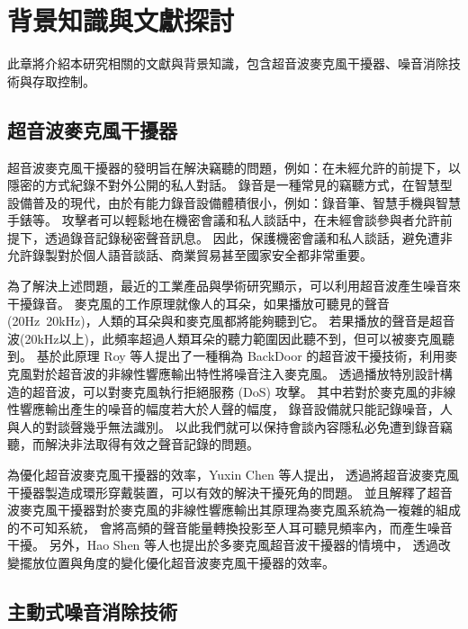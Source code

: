 \chapter{背景知識與文獻探討}

    此章將介紹本研究相關的文獻與背景知識，包含超音波麥克風干擾器、噪音消除技術與存取控制。

\section{超音波麥克風干擾器}

    超音波麥克風干擾器的發明旨在解決竊聽的問題，例如：在未經允許的前提下，以隱密的方式紀錄不對外公開的私人對話。
錄音是一種常見的竊聽方式，在智慧型設備普及的現代，由於有能力錄音設備體積很小，例如：錄音筆、智慧手機與智慧手錶等。
攻擊者可以輕鬆地在機密會議和私人談話中，在未經會談參與者允許前提下，透過錄音記錄秘密聲音訊息。
因此，保護機密會議和私人談話，避免遭非允許錄製對於個人語音談話、商業貿易甚至國家安全都非常重要。

    為了解決上述問題，最近的工業產品與學術研究\cite{chen2020wearable}顯示，可以利用超音波產生噪音來干擾錄音。
麥克風的工作原理就像人的耳朵，如果播放可聽見的聲音(20Hz~20kHz)，人類的耳朵與和麥克風都將能夠聽到它。
若果播放的聲音是超音波(20kHz以上)，此頻率超過人類耳朵的聽力範圍因此聽不到，但可以被麥克風聽到。
基於此原理 Roy 等人提出了一種稱為 BackDoor 的超音波干擾技術，利用麥克風對於超音波的非線性響應輸出特性將噪音注入麥克風。
透過播放特別設計構造的超音波，可以對麥克風執行拒絕服務 (DoS) 攻擊\cite{roy2017backdoor}。
其中若對於麥克風的非線性響應輸出產生的噪音的幅度若大於人聲的幅度，
錄音設備就只能記錄噪音，人與人的對談聲幾乎無法識別\cite{shen2019jamsys}。
以此我們就可以保持會談內容隱私必免遭到錄音竊聽，而解決非法取得有效之聲音記錄的問題。

    為優化超音波麥克風干擾器的效率，Yuxin Chen 等人提出，
透過將超音波麥克風干擾器製造成環形穿戴裝置，可以有效的解決干擾死角的問題\cite{chen2020demonstrating}。
並且解釋了超音波麥克風干擾器對於麥克風的非線性響應輸出其原理為麥克風系統為一複雜的組成的不可知系統，
會將高頻的聲音能量轉換投影至人耳可聽見頻率內，而產生噪音干擾\cite{chen2019understanding}。
另外，Hao Shen 等人也提出於多麥克風超音波干擾器的情境中，
透過改變擺放位置與角度的變化優化超音波麥克風干擾器的效率\cite{shen2019jamsys}。

\section{主動式噪音消除技術}

